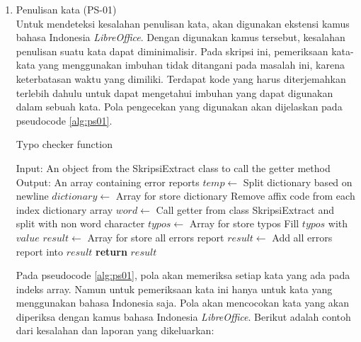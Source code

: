 \begin{enumerate}
	\item Penulisan kata (PS-01) \\
	Untuk mendeteksi kesalahan penulisan kata, akan digunakan ekstensi kamus bahasa Indonesia \textit{LibreOffice}. Dengan digunakan kamus tersebut, kesalahan penulisan suatu kata dapat diminimalisir. Pada skripsi ini, pemeriksaan kata-kata yang menggunakan imbuhan tidak ditangani pada masalah ini, karena keterbatasan waktu yang dimiliki. Terdapat kode yang harus diterjemahkan terlebih dahulu untuk dapat mengetahui imbuhan yang dapat digunakan dalam sebuah kata. Pola pengecekan yang digunakan akan dijelaskan pada pseudocode \ref{alg:ps01}.
		
\begin{minipage}{1.0\linewidth}
\begin{algorithm}[H]
    \caption{Typo checker function}
	\label{alg:ps01}
	\begin{algorithmic}[1]
    		\State Input: An object from the SkripsiExtract class to call the getter method
			\State Output: An array containing error reports		
			\State $temp \gets$ Split dictionary based on newline
			\State $dictionary \gets$ Array for store dictionary
				\State Remove affix code from each index dictionary array 
			\EndFor
			\State $word \gets$ Call getter from class SkripsiExtract and split with non word character
			\State $typos \gets$ Array for store typos
                	\State Fill $typos$ with $value$
            	\EndIf
        	\EndFor
			\State $result \gets$ Array for store all errors report
                \State $result \gets$ Add all errors report into $result$
            \EndIf
    		\State \textbf{return} $result$
    	\EndFunction
	\end{algorithmic}
\end{algorithm}
\end{minipage}
\medskip

	Pada pseudocode \ref{alg:ps01}, pola akan memeriksa setiap kata yang ada pada indeks array. Namun untuk pemeriksaan kata ini hanya untuk kata yang menggunakan bahasa Indonesia saja. Pola akan mencocokan kata yang akan diperiksa dengan kamus bahasa Indonesia \textit{LibreOffice}. Berikut adalah contoh dari kesalahan dan laporan yang dikeluarkan:
	

\end{enumerate}
